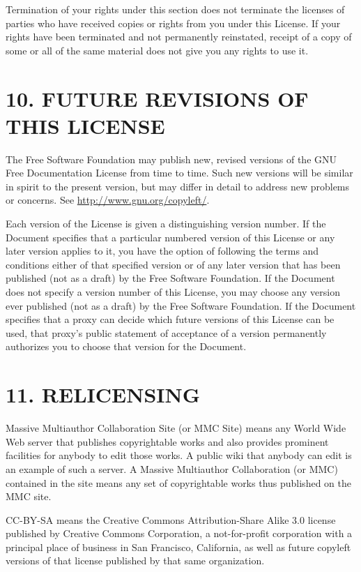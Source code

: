 \documentclass[captions=tableheading]{scrbook}
\begin{document}
Termination of your rights under this section does not terminate the licenses of parties who have received copies or rights from you under this License. If your rights have been terminated and not permanently reinstated, receipt of a copy of some or all of the same material does not give you any rights to use it.
\section{10. FUTURE REVISIONS OF THIS LICENSE}
\label{sec-18-11}


The Free Software Foundation may publish new, revised versions of the GNU Free Documentation License from time to time. Such new versions will be similar in spirit to the present version, but may differ in detail to address new problems or concerns. See \href{http://www.gnu.org/copyleft/}{http://www.gnu.org/copyleft/}.

Each version of the License is given a distinguishing version number. If the Document specifies that a particular numbered version of this License or any later version applies to it, you have the option of following the terms and conditions either of that specified version or of any later version that has been published (not as a draft) by the Free Software Foundation. If the Document does not specify a version number of this License, you may choose any version ever published (not as a draft) by the Free Software Foundation. If the Document specifies that a proxy can decide which future versions of this License can be used, that proxy's public statement of acceptance of a version permanently authorizes you to choose that version for the Document.
\section{11. RELICENSING}
\label{sec-18-12}


Massive Multiauthor Collaboration Site (or MMC Site) means any World Wide Web server that publishes copyrightable works and also provides prominent facilities for anybody to edit those works. A public wiki that anybody can edit is an example of such a server. A Massive Multiauthor Collaboration (or MMC) contained in the site means any set of copyrightable works thus published on the MMC site.

CC-BY-SA means the Creative Commons Attribution-Share Alike 3.0 license published by Creative Commons Corporation, a not-for-profit corporation with a principal place of business in San Francisco, California, as well as future copyleft versions of that license published by that same organization.
\end{document}
